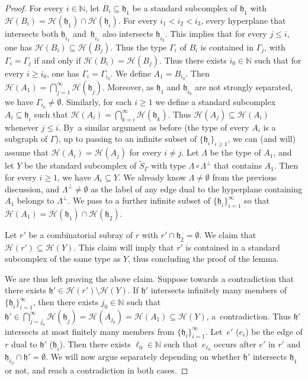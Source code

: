 \documentclass[JEP,XML,SOM,Unicode,NoFloatCountersInSection,published]{cedram}
\let\mathcal\mathscr
\theoremstyle{plain}
\theoremstyle{definition}
\newcommand{\calh}{\mathcal{H}}
\begin{document}
\begin{proof}
For every $i\in\mathbb{N}$, let $B_i\subseteq\mathfrak h_1$ be a standard subcomplex of $\mathfrak h_1$ with $\calh(B_i)=\calh(\mathfrak h_1)\cap \calh(\mathfrak h_i)$. For every $i_1<i_2<i_3$, every hyperplane that intersects both $\mathfrak h_{i_1}$ and~$\mathfrak h_{i_3}$ also intersects $\mathfrak h_{i_2}$. This implies that for every $j\le i$, one has $\calh(B_i)\subseteq \calh(B_j)$. Thus the type $\Gamma_i$ of $B_i$ is contained in $\Gamma_j$, with $\Gamma_i=\Gamma_j$ if and only if $\calh(B_i)=\calh(B_j)$. Thus there exists $i_0\in\mathbb{N}$ such that for every $i\ge i_0$, one has $\Gamma_i=\Gamma_{i_0}$. We define $A_1=B_{i_0}$. Then $\calh(A_1)=\bigcap_{j=1}^{\infty}\calh(\mathfrak h_j)$. Moreover, as $\mathfrak h_1$ and $\mathfrak h_{i_0}$ are not strongly separated, we have $\Gamma_{i_0}\neq\emptyset$. Similarly, for each $i\ge 1$ we define a standard subcomplex $A_i\subseteq \mathfrak h_i$ such that $\calh(A_i)=\bigcap_{k=i}^{\infty}\calh(\mathfrak h_k)$. Thus $\calh(A_j)\subseteq\calh(A_i)$ whenever $j\le i$. By~a similar argument as before (the type of every $A_i$ is a subgraph of $\Gamma$), up to passing to an infinite subset of $\{\mathfrak h_i\}_{i\ge 1}$, we can (and will) assume that $\calh(A_i)=\calh(A_j)$ for every $i\neq j$. Let $\Lambda$ be the type of $A_1$, and let $Y$ be the standard subcomplex of $\widetilde{S}_\Gamma$ with type $\Lambda\circ\Lambda^\perp$ that contains $A_1$. Then for every $i\ge 1$, we have $A_i\subseteq Y$. We already know $\Lambda\neq\emptyset$ from the previous discussion, and $\Lambda^\perp\neq\emptyset$ as the label of any edge dual to the hyperplane containing $A_1$ belongs to $\Lambda^\perp$. We pass to a further infinite subset of $\{\mathfrak h_i\}_{i=1}^\infty$ so that $\calh(A_1)=\calh(\mathfrak h_1)\cap \calh(\mathfrak h_2)$.

Let $r'$ be a combinatorial subray of $r$ with $r'\cap \mathfrak h_2=\emptyset$. We claim that $\calh(r')\subseteq\calh(Y)$. This claim will imply that $r'$ is contained in a standard subcomplex of the same type as $Y$, thus concluding the proof of the lemma.

We are thus left proving the above claim. Suppose towards a contradiction that there exists $\mathfrak h'\in \calh(r')\setminus\calh(Y)$. If $\mathfrak h'$ intersects infinitely many members of $\{\mathfrak h_i\}_{i=1}^\infty$, then there exists $j_0\in\mathbb{N}$ such that $\mathfrak h'\in \bigcap_{j=j_0}^\infty \calh(\mathfrak h_j)= \calh(A_{j_0})=\calh(A_1)\subseteq\calh(Y)$, a~contradiction. Thus $\mathfrak h'$ intersects at most finitely many members from $\{\mathfrak h_i\}_{i=1}^\infty$. Let~$e'$ (\resp $e_i$) be the edge of $r$ dual to $\mathfrak h'$ (\resp $\mathfrak h_i$). Then there exists $\ell_0\in\mathbb{N}$ such that~$e_{\ell_0}$ occurs after $e'$ in $r'$ and $\mathfrak h_{\ell_0}\cap \mathfrak h'=\emptyset$. We will now argue separately depending on whether $\mathfrak{h}'$ intersects $\mathfrak{h}_1$ or not, and reach a contradiction in both cases.


\end{proof}
\end{document}
